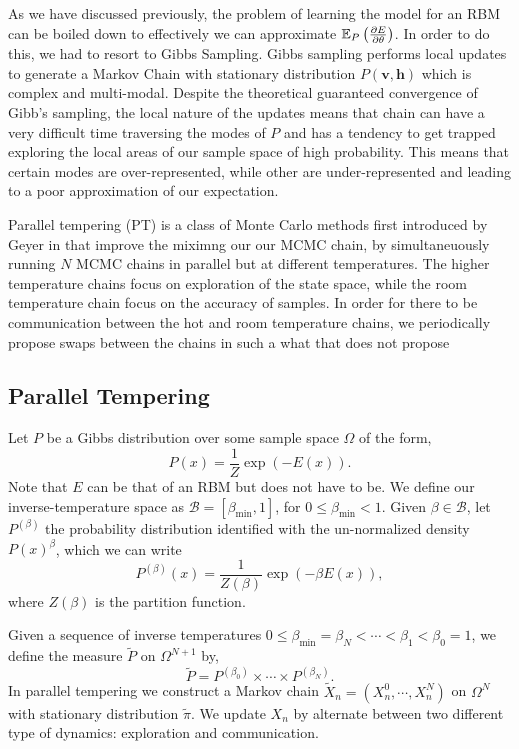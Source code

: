 As we have discussed previously, the problem of learning the model for an RBM can be boiled down to effectively we can approximate ${\mathbb{E}}_P\left(\frac{\partial E}{\partial \theta}\right)$. In order to do this, we had to resort to Gibbs Sampling. 
Gibbs sampling performs local updates to generate a Markov Chain with stationary distribution $P(\textbf{v},\textbf{h})$ which is complex and multi-modal. Despite the theoretical guaranteed convergence of Gibb's sampling, the local nature of the updates means that chain can have a very difficult time traversing the modes of $P$ and  has a tendency to get trapped exploring the local areas of our sample space of high probability. This means that certain modes are over-represented, while other are under-represented and leading to a poor approximation of our expectation.

Parallel tempering (PT) is a class of Monte Carlo methods first introduced by Geyer in \cite{geyer1991markov} that improve the miximng our our MCMC chain, by simultaneuously running $N$ MCMC chains in parallel but at different temperatures. The higher temperature chains focus on exploration of the state space, while the room temperature chain focus on the accuracy of samples. In order for there to be communication between the hot and room temperature chains, we periodically propose swaps between the chains in such a what that does not propose 


\subsection{Parallel Tempering}\label{sec_PT}
Let $P$ be a Gibbs distribution over some sample space $\Omega$ of the form,
\[P(x)=\frac{1}{Z} \exp(-E(x)).\]
Note that $E$ can be that of an RBM but does not have to be. We define our inverse-temperature space as $\mathcal{B}=[\beta_{\min},1]$, for $0\leq \beta_{\min}<1$. Given $\beta\in\mathcal{B}$, let $P^{(\beta)}$ the probability distribution identified with the un-normalized density $P(x)^\beta$, which we can write
\[P^{(\beta)}(x)= \frac{1}{Z(\beta)} \exp(-\beta E(x)),\]
where $Z(\beta)$ is the partition function. 

Given a sequence of inverse temperatures $0\leq\beta_{\min}= \beta_N<\cdots<\beta_{1}<\beta_0=1$, we define the measure $\tilde{P}$ on $\Omega^{N+1}$ by,
\[\tilde{P}=P^{(\beta_0)}\times\cdots\times P^{(\beta_N)}.\]
In parallel tempering we construct a Markov chain $\tilde{X}_n=(X_n^{0},\cdots, X^{N}_n)$ on $\Omega^N$ with stationary distribution $\tilde{\pi}$. We update $X_n$ by alternate between two different type of dynamics: exploration and communication. 

